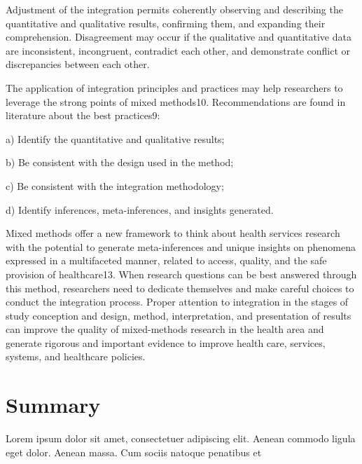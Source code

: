 Adjustment of the integration permits coherently observing and describing the quantitative and qualitative results, confirming them, and expanding their comprehension. Disagreement may occur if the qualitative and quantitative data are inconsistent, incongruent, contradict each other, and demonstrate conflict or discrepancies between each other.

The application of integration principles and practices may help researchers to leverage the strong points of mixed methods10. Recommendations are found in literature about the best practices9:

a) Identify the quantitative and qualitative results;

b) Be consistent with the design used in the method;

c) Be consistent with the integration methodology;

d) Identify inferences, meta-inferences, and insights generated.

Mixed methods offer a new framework to think about health services research with the potential to generate meta-inferences and unique insights on phenomena expressed in a multifaceted manner, related to access, quality, and the safe provision of healthcare13. When research questions can be best answered through this method, researchers need to dedicate themselves and make careful choices to conduct the integration process. Proper attention to integration in the stages of study conception and design, method, interpretation, and presentation of results can improve the quality of mixed-methods research in the health area and generate rigorous and important evidence to improve health care, services, systems, and healthcare policies.



\section{Summary}\label{ch14:summary}

Lorem ipsum dolor sit amet, consectetuer adipiscing elit. Aenean commodo ligula eget dolor. Aenean massa. Cum sociis natoque penatibus et
